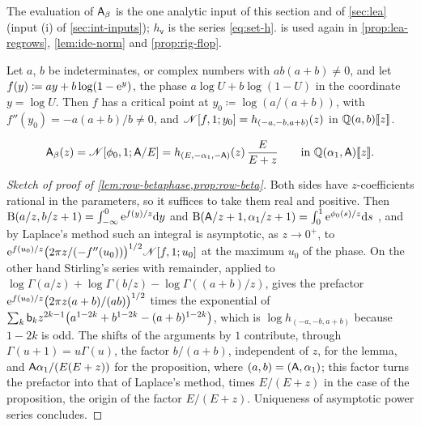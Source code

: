 The evaluation of $\mathsf{A}_{\beta}$ is the one analytic input of this section and of \cref{sec:lea} (input (i) of \cref{sec:int-inputs}); $h_{\mathsf{v}}$ is the series \eqref{eq:set-h}.  is used again in \cref{prop:lea-regrows}, \cref{lem:ide-norm} and \cref{prop:rig-flop}.

\begin{lem}
\label{lem:row-betaphase}
Let $a$, $b$ be indeterminates, or complex numbers with $ab(a+b)\neq0$, and let $f(y)\coloneqq ay+b\log(1-\mathrm{e}^y)$, the phase $a\log U+b\log(1-U)$ in the coordinate $y=\log U$. Then $f$ has a critical point at $y_0\coloneqq\log(a/(a+b))$, with $f''(y_0)=-a(a+b)/b\neq0$, and $\mathscr{N}[f,1;y_0]=h_{(-a,-b,a+b)}(z)$ in $\mathbb{Q}(a,b)[\![ z ]\!]$.
\end{lem}

\begin{prop}
\label{prop:row-beta}
\begin{equation}
\label{eq:row-beta}
\mathsf{A}_{\beta}(z)=\mathscr{N}[\phi_0,1;\mathsf{A}/E]=h_{(E,-\alpha_1,-\mathsf{A})}(z)\,\frac{E}{E+z}\qquad\text{in }\mathbb{Q}(\alpha_1,\mathsf{A})[\![ z ]\!] .
\end{equation}
\end{prop}

\begin{proof}[Sketch of proof of \cref{lem:row-betaphase,prop:row-beta}]
Both sides have $z$-coefficients rational in the parameters, so it suffices to take them real and positive. Then $\mathrm{B}(a/z,b/z+1)=\int_{-\infty}^0\mathrm{e}^{f(y)/z}\mathrm{d} y$ and $\mathrm{B}(\mathsf{A}/z+1,\alpha_1/z+1)=\int_0^1\mathrm{e}^{\phi_0(s)/z}\mathrm{d} s$ \cite[5.12.1]{DLMF}, and by Laplace's method  such an integral is asymptotic, as $z\to0^+$, to $\mathrm{e}^{f(u_0)/z}\big(2\pi z/(-f''(u_0))\big)^{1/2}\mathscr{N}[f,1;u_0]$ at the maximum $u_0$ of the phase. On the other hand Stirling's series with remainder, applied to $\log\Gamma(a/z)+\log\Gamma(b/z)-\log\Gamma((a+b)/z)$, gives the prefactor $\mathrm{e}^{f(u_0)/z}\big(2\pi z(a+b)/(ab)\big)^{1/2}$ times the exponential of $\sum_k\mathsf{b}_kz^{2k-1}\big(a^{1-2k}+b^{1-2k}-(a+b)^{1-2k}\big)$, which is $\log h_{(-a,-b,a+b)}$ because $1-2k$ is odd. The shifts of the arguments by $1$ contribute, through $\Gamma(u+1)=u\Gamma(u)$, the factor $b/(a+b)$, independent of $z$, for the lemma, and $\mathsf{A}\alpha_1/(E(E+z))$ for the proposition, where $(a,b)=(\mathsf{A},\alpha_1)$; this factor turns the prefactor into that of Laplace's method, times $E/(E+z)$ in the case of the proposition, the origin of the factor $E/(E+z)$. Uniqueness of asymptotic power series concludes.
\end{proof}

